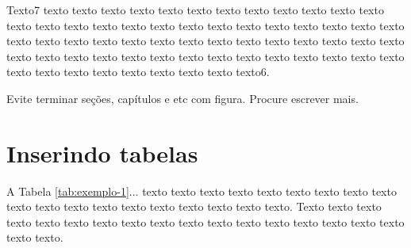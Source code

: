     Texto7 texto texto texto texto texto texto texto texto texto texto texto texto texto texto texto texto texto texto texto texto texto texto texto texto texto texto texto texto texto texto texto texto texto texto texto texto texto texto texto texto texto texto texto texto texto texto texto texto texto texto texto texto texto texto texto texto texto texto texto texto texto texto texto6.

    Evite terminar seções, capítulos e etc com figura. Procure escrever mais.

\section{Inserindo tabelas}\label{sec:tabelas}
    
    A Tabela \ref{tab:exemplo-1}... texto texto texto texto texto texto texto texto texto texto texto texto texto texto texto texto texto texto texto. Texto texto texto texto texto texto texto texto texto texto texto texto texto texto texto texto texto texto texto.
	
	\begin{table}[!h]
	\captionsetup{width=7cm}%
	\caption{\label{tab:exemplo-1} Um Exemplo de tabela alinhada que pode ser longa ou curta}%
    \end{table}


